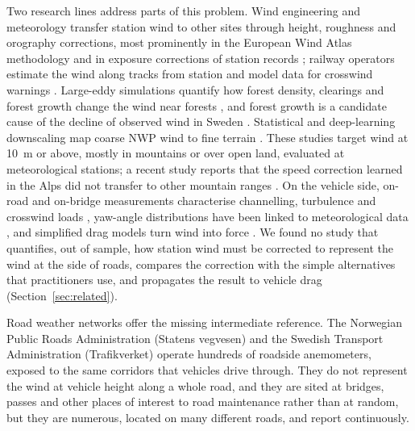 Two research lines address parts of this problem. Wind engineering and meteorology transfer station wind to other sites through height, roughness and orography corrections, most prominently in the European Wind Atlas methodology \citep{TroenPetersen1989} and in exposure corrections of station records \citep{Wieringa1986,Wieringa1993,Verkaik2000}; railway operators estimate the wind along tracks from station and model data for crosswind warnings \citep{Hoppmann2002,Herb2007}. Large-eddy simulations quantify how forest density, clearings and forest growth change the wind near forests \citep{Chaudhari2026,Topic2026}, and forest growth is a candidate cause of the decline of observed wind in Sweden \citep{Minola2023}. Statistical and deep-learning downscaling map coarse NWP wind to fine terrain \citep{HowardClark2007,Winstral2017,DujardinLehning2022,Dupuy2023,LeToumelin2023,LeToumelin2024,Lian2024}. These studies target wind at \SI{10}{m} or above, mostly in mountains or over open land, evaluated at meteorological stations; a recent study reports that the speed correction learned in the Alps did not transfer to other mountain ranges \citep{LeToumelin2024}. On the vehicle side, on-road and on-bridge measurements characterise channelling, turbulence and crosswind loads \citep{WordleySaunders2008,McTavish2024,Reymert2024,Reymert2025}, yaw-angle distributions have been linked to meteorological data \citep{Xiao2023}, and simplified drag models turn wind into force \citep{Askerdal2024crosswind}. We found no study that quantifies, out of sample, how station wind must be corrected to represent the wind at the side of roads, compares the correction with the simple alternatives that practitioners use, and propagates the result to vehicle drag (Section~\ref{sec:related}).

Road weather networks offer the missing intermediate reference. The Norwegian Public Roads Administration (Statens vegvesen) and the Swedish Transport Administration (Trafikverket) operate hundreds of roadside anemometers, exposed to the same corridors that vehicles drive through. They do not represent the wind at vehicle height along a whole road, and they are sited at bridges, passes and other places of interest to road maintenance rather than at random, but they are numerous, located on many different roads, and report continuously.


